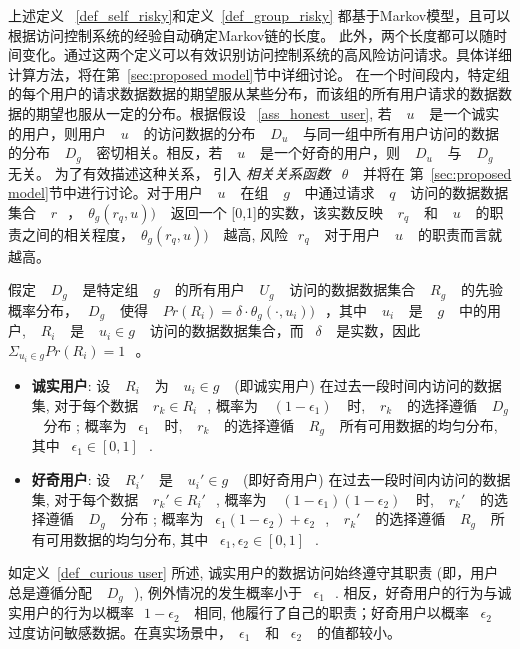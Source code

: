上述定义 ~\ref{def_self_risky}和定义~\ref{def_group_risky} 都基于Markov模型，且可以根据访问控制系统的经验自动确定Markov链的长度。 此外，两个长度都可以随时间变化。通过这两个定义可以有效识别访问控制系统的高风险访问请求。具体详细计算方法，将在第~\ref{sec:proposed model}节中详细讨论。 在一个时间段内，特定组的每个用户的请求数据数据的期望服从某些分布，而该组的所有用户请求的数据数据的期望也服从一定的分布。根据假设 ~\ref{ass_honest_user}, 若 ~$~u~$~ 是一个诚实的用户，则用户 ~$~u~$~ 的访问数据的分布 ~$~D_u~$~ 与同一组中所有用户访问的数据的分布 ~$~D_g~$~ 密切相关。相反，若 ~$~u~$~ 是一个好奇的用户，则 ~$~D_u~$~ 与 ~$~D_g~$~ 无关。 为了有效描述这种关系， 引入 \emph{相关关系函数} ~$\theta~$~ 并将在 第~\ref{sec:proposed model}节中进行讨论。对于用户 ~$~u~$~ 在组 ~$~g~$~ 中通过请求 ~$~q~$~ 访问的数据数据集合 ~$~r~$~，~$\theta_g (r_q,u))~$~ 返回一个 [0,1]的实数，该实数反映 ~$~r_q~$~ 和 ~$~u~$~ 的职责之间的相关程度，~$\theta_g (r_q,u))~$~ 越高, 风险~$~r_q~$~ 对于用户 ~$~u~$~ 的职责而言就越高。


\begin{definition}%
	\label{def_curious user}
	假定 ~$~D_g~$~ 是特定组 ~$~g~$~ 的所有用户 ~$~U_g~$~ 访问的数据数据集合 ~$~R_g~$~ 的先验概率分布，~$~D_g~$~ 使得 ~$~Pr(R_i)=\delta \cdot \theta_g (\cdot,u_i))~$~，其中 ~$~u_i~$~ 是 ~$~g~$~ 中的用户, ~$~R_i~$~ 是 ~$~u_i \in g~$~ 访问的数据数据集合，而 ~$\delta~$~ 是实数，因此 ~$\Sigma_{u_i \in g}Pr(R_i) = 1~$~。
	\begin{itemize}
		\item \textbf{诚实用户}: 设 ~$~R_i~$~ 为 ~$~u_i \in g~$~ (即诚实用户) 在过去一段时间内访问的数据集, 对于每个数据 ~$~r_k \in R_i~$~, 概率为 ~$~(1-\epsilon_1)~$~ 时,  ~$~r_k~$~ 的选择遵循 ~$~D_g~$~ 分布 ; 概率为 ~$\epsilon_1~$~ 时,  ~$~r_k~$~ 的选择遵循 ~$~R_g~$~ 所有可用数据的均匀分布, 其中 ~$\epsilon_1 \in [0,1]~$~.
		\item \textbf{好奇用户}: 设 ~$~R_i'~$~ 是 ~$~u_i' \in g~$~ (即好奇用户) 在过去一段时间内访问的数据集, 对于每个数据 ~$~r_k' \in R_i'~$~, 概率为 ~$~(1-\epsilon_1)(1-\epsilon_2)~$~ 时,  ~$~r_k'~$~ 的选择遵循 ~$~D_g~$~ 分布 ; 概率为 ~$\epsilon_1 (1 - \epsilon_2)+ \epsilon_2~$~,  ~$~r_k'~$~ 的选择遵循 ~$~R_g~$~ 所有可用数据的均匀分布, 其中 ~$\epsilon_1, \epsilon_2 \in [0,1]~$~.
	\end{itemize}
\end{definition}

如定义~\ref{def_curious user} 所述, 诚实用户的数据访问始终遵守其职责 (即，用户总是遵循分配 ~$~D_g~$~), 例外情况的发生概率小于 ~$\epsilon_1~$~. 相反，好奇用户的行为与诚实用户的行为以概率~$~1-\epsilon_2~$~ 相同, 他履行了自己的职责；好奇用户以概率 ~$\epsilon_2~$~ 过度访问敏感数据。在真实场景中，~$\epsilon_1~$~ 和 ~$\epsilon_2~$~ 的值都较小。

